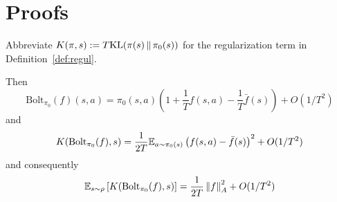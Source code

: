 \documentclass[11pt,a4paper]{article}
\newcommand{\Bol}{\mathrm{Bolt}_{\pi_0}}
\newcommand{\piref}{{\pi_0}}
\newcommand{\TODO}[1]{{\color{red} TODO: {#1}}}
\newcommand{\option}[1]{{\color[rgb]{.4,0,.8}[Optional:#1]}} %
\renewcommand{\TODO}[1]{}
\renewcommand{\option}[1]{}  %
\begin{document}

\section{Proofs}
\label{sec:proofs}

% 
% 

\option{
\paragraph{BC regularization with large $T$ is equivalent to natural
policy gradient.}

Nat grad = Fisher.policy grad by def.  P(theta).df/dtheta equiv to
penalty P at first order. Only first-order behavior of objective matters.
First-order objectives coincide by pol grad thm (note: additional
}

\begin{lem}
\label{lem:KLboltz}
Abbreviate $K(\pi,s)\mathrel{\mathop{:}}= T \mathrm{KL}\!\left(\pi(s) \,|\hspace{-.15ex}|\,\pi_0(s)\right)$ for the regularization
term in Definition~\ref{def:regul}.

Then
\begin{equation}
\Bol(f)(s,a)=\piref(s,a)\left(1+\frac1T f(s,a)-\frac1T\bar f(s)\right)+O(1/T^2)
\end{equation}
and
\begin{equation}
K(\Bol(f),s)
=\frac1{2 T} \E_{a\sim \piref(s)} \left(
f(s,a)-\bar f(s)\right)^2+O(1/T^2)
\end{equation}
and consequently
\begin{equation}
\E_{s\sim \rho} \left[%
K(\Bol(f),s)
\right]
=\frac1{2T} \norm{f}^2_A+O(1/T^2)
\end{equation}
\end{lem}
\end{document}
